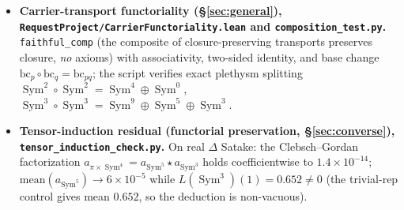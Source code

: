 \documentclass[11pt]{article}
\theoremstyle{definition}
\newcommand{\Sym}{\operatorname{Sym}}
\begin{document}
\begin{itemize}
\item \textbf{Carrier-transport functoriality (\S\ref{sec:general}), \texttt{RequestProject/CarrierFunctoriality.lean} and \texttt{composition\_test.py}.} \texttt{faithful\_comp} (the composite of closure-preserving transports preserves closure, \emph{no} axioms) with associativity, two-sided identity, and base change $\mathrm{bc}_p\circ\mathrm{bc}_q=\mathrm{bc}_{pq}$; the script verifies exact plethysm splitting $\Sym^2\!\circ\Sym^2=\Sym^4\oplus\Sym^0$, $\Sym^3\!\circ\Sym^3=\Sym^9\oplus\Sym^5\oplus\Sym^3$.

\item \textbf{Tensor-induction residual (functorial preservation, \S\ref{sec:converse}), \texttt{tensor\_induction\_check.py}.} On real $\Delta$ Satake: the Clebsch--Gordan factorization $a_{\pi\times\Sym^4}=a_{\Sym^5}\!\star a_{\Sym^3}$ holds coefficientwise to $1.4\times10^{-14}$; $\mathrm{mean}(a_{\Sym^5})\to6\times10^{-5}$ while $L(\Sym^3)(1)=0.652\ne0$ (the trivial-rep control gives mean $0.652$, so the deduction is non-vacuous).
\end{itemize}
\end{document}
